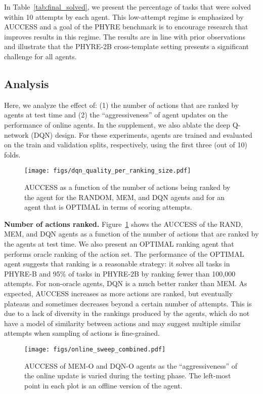 \documentclass{article}
\begin{document}
In Table~\ref{tab:final_solved}, we present the percentage of tasks that were solved within 10 attempts by each agent. This low-attempt regime is emphasized by AUCCESS and a goal of the PHYRE benchmark is to encourage research that improves results in this regime. The results are in line with prior observations and illustrate that the PHYRE-2B cross-template setting presents a significant challenge for all agents.

\subsection{Analysis}
\label{ref:ablation}
Here, we analyze the effect of: (1) the number of actions that are ranked by agents at test time and (2) the ``aggressiveness'' of agent updates on the performance of online agents. In the supplement, we also ablate the deep Q-network (DQN) design.
For these experiments, agents are trained and evaluated on the train and validation splits, respectively, using the first three (out of 10) folds.

\begin{figure}[t]
\centering
\texttt{[image: figs/dqn\_quality\_per\_ranking\_size.pdf]}
\vspace{-2mm}
\caption{AUCCESS as a function of the number of actions being ranked by the agent for the RANDOM, MEM, and DQN agents and for an agent that is OPTIMAL in terms of scoring attempts.}
\label{fig:dqn_rerank_size}
\end{figure}

\noindent\textbf{Number of actions ranked.} Figure~\ref{fig:dqn_rerank_size} shows the AUCCESS of the RAND, MEM, and DQN agents as a function of the number of actions that are ranked by the agents at test time. We also present an OPTIMAL ranking agent that performs oracle ranking of the action set. The performance of the OPTIMAL agent suggests that ranking is a reasonable strategy: it solves all tasks in PHYRE-B and 95\% of tasks in PHYRE-2B by ranking fewer than 100,000 attempts. For non-oracle agents, DQN is a much better ranker than MEM. As expected, AUCCESS increases as more actions are ranked, but eventually plateaus and sometimes decreases beyond a certain number of attempts. This is due to a lack of diversity in the rankings produced by the agents, which do not have a model of similarity between actions and may suggest multiple similar attempts when sampling of actions is fine-grained.

\begin{figure}[t]
\centering
\texttt{[image: figs/online\_sweep\_combined.pdf]}
\vspace{-2mm}
\caption{AUCCESS of MEM-O and DQN-O agents as the ``aggressiveness'' of the online update is varied during the testing phase. The left-most point in each plot is an offline version of the agent.}
\label{fig:online_sweep}
\end{figure}
\end{document}
